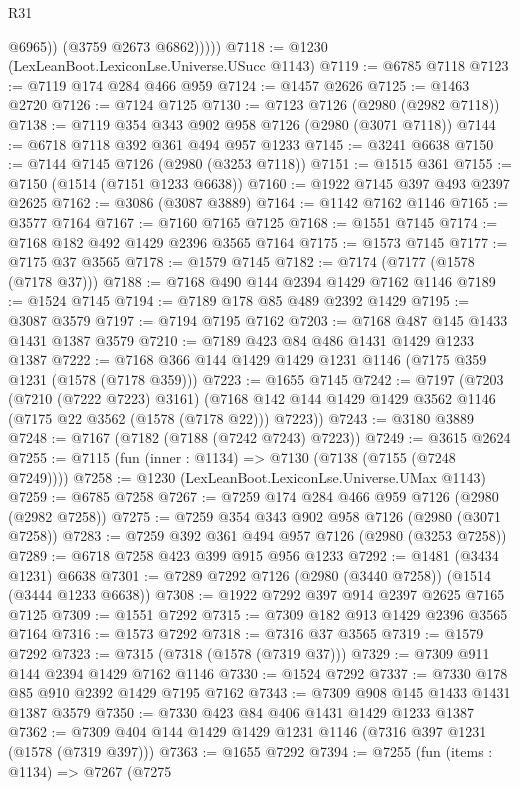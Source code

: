 \begin{lexlean}{R31}
\begin{coremodule}
                @6965))
            (@3759 @2673 @6862)))))
@7118 := @1230 (LexLeanBoot.LexiconLse.Universe.USucc @1143)
@7119 := @6785 @7118
@7123 := @7119 @174 @284 @466 @959
@7124 := @1457 @2626
@7125 := @1463 @2720
@7126 := @7124 @7125
@7130 := @7123 @7126 (@2980 (@2982 @7118))
@7138 := @7119 @354 @343 @902 @958 @7126 (@2980 (@3071 @7118))
@7144 := @6718 @7118 @392 @361 @494 @957 @1233
@7145 := @3241 @6638
@7150 := @7144 @7145 @7126 (@2980 (@3253 @7118))
@7151 := @1515 @361
@7155 := @7150 (@1514 (@7151 @1233 @6638))
@7160 := @1922 @7145 @397 @493 @2397 @2625
@7162 := @3086 (@3087 @3889)
@7164 := @1142 @7162 @1146
@7165 := @3577 @7164
@7167 := @7160 @7165 @7125
@7168 := @1551 @7145
@7174 := @7168 @182 @492 @1429 @2396 @3565 @7164
@7175 := @1573 @7145
@7177 := @7175 @37 @3565
@7178 := @1579 @7145
@7182 := @7174 (@7177 (@1578 (@7178 @37)))
@7188 := @7168 @490 @144 @2394 @1429 @7162 @1146
@7189 := @1524 @7145
@7194 := @7189 @178 @85 @489 @2392 @1429
@7195 := @3087 @3579
@7197 := @7194 @7195 @7162
@7203 := @7168 @487 @145 @1433 @1431 @1387 @3579
@7210 := @7189 @423 @84 @486 @1431 @1429 @1233 @1387
@7222 := @7168 @366 @144 @1429 @1429 @1231 @1146 (@7175 @359 @1231 (@1578 (@7178 @359)))
@7223 := @1655 @7145
@7242 := @7197
    (@7203
      (@7210 (@7222 @7223) @3161)
      (@7168 @142 @144 @1429 @1429 @3562 @1146 (@7175 @22 @3562 (@1578 (@7178 @22))) @7223))
@7243 := @3180 @3889
@7248 := @7167 (@7182 (@7188 (@7242 @7243) @7223))
@7249 := @3615 @2624
@7255 := @7115 (fun (inner : @1134) => @7130 (@7138 (@7155 (@7248 @7249))))
@7258 := @1230 (LexLeanBoot.LexiconLse.Universe.UMax @1143)
@7259 := @6785 @7258
@7267 := @7259 @174 @284 @466 @959 @7126 (@2980 (@2982 @7258))
@7275 := @7259 @354 @343 @902 @958 @7126 (@2980 (@3071 @7258))
@7283 := @7259 @392 @361 @494 @957 @7126 (@2980 (@3253 @7258))
@7289 := @6718 @7258 @423 @399 @915 @956 @1233
@7292 := @1481 (@3434 @1231) @6638
@7301 := @7289 @7292 @7126 (@2980 (@3440 @7258)) (@1514 (@3444 @1233 @6638))
@7308 := @1922 @7292 @397 @914 @2397 @2625 @7165 @7125
@7309 := @1551 @7292
@7315 := @7309 @182 @913 @1429 @2396 @3565 @7164
@7316 := @1573 @7292
@7318 := @7316 @37 @3565
@7319 := @1579 @7292
@7323 := @7315 (@7318 (@1578 (@7319 @37)))
@7329 := @7309 @911 @144 @2394 @1429 @7162 @1146
@7330 := @1524 @7292
@7337 := @7330 @178 @85 @910 @2392 @1429 @7195 @7162
@7343 := @7309 @908 @145 @1433 @1431 @1387 @3579
@7350 := @7330 @423 @84 @406 @1431 @1429 @1233 @1387
@7362 := @7309 @404 @144 @1429 @1429 @1231 @1146 (@7316 @397 @1231 (@1578 (@7319 @397)))
@7363 := @1655 @7292
@7394 := @7255
    (fun (items : @1134) =>
    @7267
      (@7275

\end{coremodule}
\end{lexlean}

